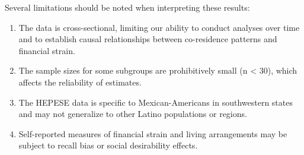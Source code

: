 \documentclass[
]{article}
\begin{document}
Several limitations should be noted when interpreting these results:

\begin{enumerate}
\def\labelenumi{\arabic{enumi}.}
\item
  The data is cross-sectional, limiting our ability to conduct analyses
  over time and to establish causal relationships between co-residence
  patterns and financial strain.
\item
  The sample sizes for some subgroups are prohibitively small (n
  \textless{} 30), which affects the reliability of estimates.
\item
  The HEPESE data is specific to Mexican-Americans in southwestern
  states and may not generalize to other Latino populations or regions.
\item
  Self-reported measures of financial strain and living arrangements may
  be subject to recall bias or social desirability effects.
\end{enumerate}
\end{document}
